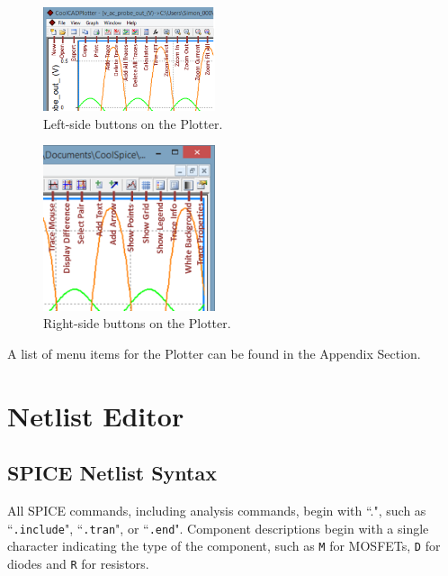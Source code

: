 \begin{figure}
    \includegraphics[width=0.45\textwidth]{./figures/appendix_buttons_menus_figures/Plotter_LeftButtons.png}
    \caption{{Left-side buttons on the Plotter.}}
  \label{fig_plotter_leftbuttons_inchapter}
\end{figure} 

\begin{figure}
    \includegraphics[width=0.45\textwidth]{./figures/appendix_buttons_menus_figures/Plotter_RightButtons.png}
    \caption{{Right-side buttons on the Plotter.}}
  \label{fig_plotter_rightbuttons_inchapter}
\end{figure} 

A list of menu items for the Plotter can be found in the Appendix Section.

\section{Netlist Editor}
\label{sec_pane_netlisteditor}

\subsection{SPICE Netlist Syntax}
\label{subsec_pane_spicenetlistsyntax}

All SPICE commands, including analysis commands, begin with ``.", such as ``\texttt{.include}", ``\texttt{.tran}", or ``\texttt{.end}".  Component descriptions begin with a single character indicating the type of the component, such as \texttt{M} for MOSFETs, \texttt{D} for diodes and \texttt{R} for resistors.  

